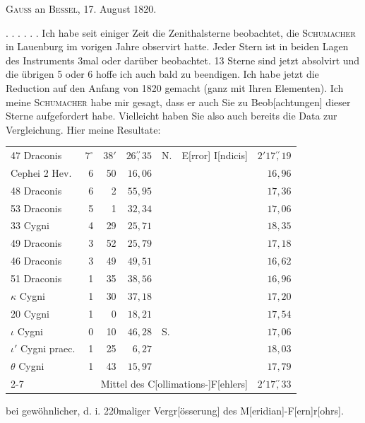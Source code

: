 \begin{center}\textsc{Gauss} an \textsc{Bessel}, 17. August 1820.\end{center}
\noindent\hspace*{\parindent}. . . . . . Ich habe seit einiger Zeit die Zenithalsterne beobachtet, die \textsc{Schumacher} in Lauenburg im vorigen Jahre observirt hatte. Jeder Stern ist in beiden Lagen des Instruments 3mal oder darüber beobachtet. 13 Sterne sind jetzt absolvirt und die übrigen 5 oder 6 hoffe ich auch bald zu beendigen. Ich habe jetzt die Reduction auf den Anfang von 1820 gemacht (ganz mit
\clearpage{}
\noindent Ihren Elementen). Ich meine \textsc{Schumacher} habe mir gesagt, dass er auch Sie zu Beob[achtungen] dieser Sterne aufgefordert habe. Vielleicht haben Sie also auch bereits die Data zur Vergleichung. Hier meine Resultate:
\begin{center}\begingroup\fontsize{10}{12}\selectfont\setlength{\tabcolsep}{2pt}
\begin{tabular}{@{}lrrrllr@{}}
47 Draconis&\(7^\circ\)&\(38'\)&\(26\overset{\prime\prime}{,}35\)&N.&E[rror] I[ndicis]&\(2'17\overset{\prime\prime}{,}19\)\\
Cephei 2 Hev.&6&50&\(16{,}06\)&&&\(16{,}96\)\\
48 Draconis&6&2&\(55{,}95\)&&&\(17{,}36\)\\
53 Draconis&5&1&\(32{,}34\)&&&\(17{,}06\)\\
33 Cygni&4&29&\(25{,}71\)&&&\(18{,}35\)\\
49 Draconis&3&52&\(25{,}79\)&&&\(17{,}18\)\\
46 Draconis&3&49&\(49{,}51\)&&&\(16{,}62\)\\
51 Draconis&1&35&\(38{,}56\)&&&\(16{,}96\)\\
\(\kappa\) Cygni&1&30&\(37{,}18\)&&&\(17{,}20\)\\
20 Cygni&1&0&\(18{,}21\)&&&\(17{,}54\)\\
\(\iota\) Cygni&0&10&\(46{,}28\)&S.&&\(17{,}06\)\\
\(\iota'\) Cygni praec.&1&25&\(6{,}27\)&&&\(18{,}03\)\\
\(\theta\) Cygni&1&43&\(15{,}97\)&&&\(17{,}79\)\\\cline{2-7}
&\multicolumn{5}{r}{Mittel des C[ollimations-]F[ehlers]}&\(2'17\overset{\prime\prime}{,}33\)
\end{tabular}\par\endgroup\end{center}
\noindent bei gewöhnlicher, d. i. 220maliger Vergr[össerung] des M[eridian]-F[ern]r[ohrs].

